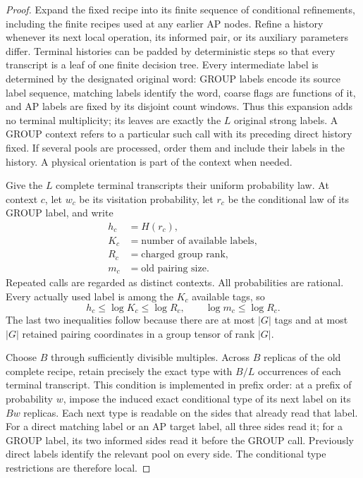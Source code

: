 \begin{proof}
Expand the fixed recipe into its finite sequence of conditional refinements,
including the finite recipes used at any earlier AP nodes.  Refine a history
whenever its next local operation, its informed pair, or its auxiliary
parameters differ.  Terminal histories can be padded by deterministic steps
so that every transcript is a leaf of one finite decision tree.  Every
intermediate label is determined by the designated original word: GROUP
labels encode its source label sequence, matching labels identify the word,
coarse flags are functions of it, and AP labels are fixed by its disjoint
count windows.  Thus this expansion adds no terminal multiplicity; its leaves
are exactly the $L$ original strong labels.  A GROUP
context refers to a particular such call with its preceding direct history
fixed.  If several pools are processed, order them and include their labels
in the history.  A physical orientation is part of the context when needed.

Give the $L$ complete terminal transcripts their uniform probability law.
At context $c$, let $w_c$ be its visitation probability, let $r_c$ be the
conditional law of its GROUP label, and write
\[
\begin{aligned}
 h_c&=H(r_c),\\
 K_c&=\text{number of available labels},\\
 R_c&=\text{charged group rank},\\
 m_c&=\text{old pairing size}.
\end{aligned}
\]
Repeated calls are regarded as distinct contexts.  All probabilities are
rational.  Every actually used label is among the $K_c$ available tags, so
\begin{equation}
 h_c\le\log K_c\le\log R_c,
 \qquad \log m_c\le\log R_c.
\label{val:group-inequalities}
\end{equation}
The last two inequalities follow because there are at most $|G|$ tags and at
most $|G|$ retained pairing coordinates in a group tensor of rank $|G|$.

Choose $B$ through sufficiently divisible multiples.  Across $B$ replicas of
the old complete recipe, retain precisely the exact type with $B/L$
occurrences of each terminal transcript.  This condition is implemented in
prefix order: at a prefix of probability $w$, impose the induced exact
conditional type of its next label on its $Bw$ replicas.  Each next type is
readable on the sides that already read that label.  For a direct matching
label or an AP target label, all three sides read it; for a GROUP label, its
two informed sides read it before the GROUP call.  Previously direct labels
identify the relevant pool on every side.  The conditional type restrictions
are therefore local.


\end{proof}
